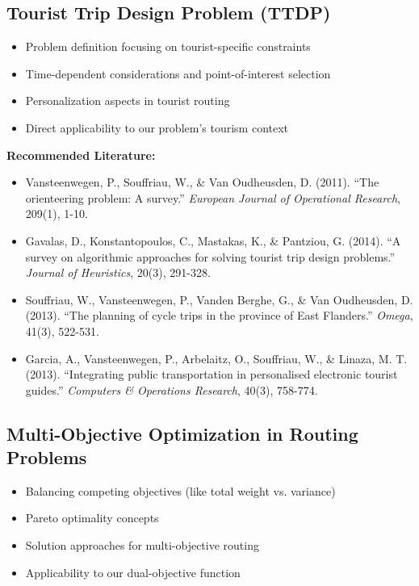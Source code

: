\subsection{Tourist Trip Design Problem (TTDP)}
\begin{itemize}
    \item Problem definition focusing on tourist-specific constraints
    \item Time-dependent considerations and point-of-interest selection
    \item Personalization aspects in tourist routing
    \item Direct applicability to our problem's tourism context
\end{itemize}

\noindent\textbf{Recommended Literature:}
\begin{itemize}
    \item Vansteenwegen, P., Souffriau, W., \& Van Oudheusden, D. (2011). ``The orienteering problem: A survey.'' \textit{European Journal of Operational Research}, 209(1), 1-10.
    \item Gavalas, D., Konstantopoulos, C., Mastakas, K., \& Pantziou, G. (2014). ``A survey on algorithmic approaches for solving tourist trip design problems.'' \textit{Journal of Heuristics}, 20(3), 291-328.
    \item Souffriau, W., Vansteenwegen, P., Vanden Berghe, G., \& Van Oudheusden, D. (2013). ``The planning of cycle trips in the province of East Flanders.'' \textit{Omega}, 41(3), 522-531.
    \item Garcia, A., Vansteenwegen, P., Arbelaitz, O., Souffriau, W., \& Linaza, M. T. (2013). ``Integrating public transportation in personalised electronic tourist guides.'' \textit{Computers \& Operations Research}, 40(3), 758-774.
\end{itemize}

\subsection{Multi-Objective Optimization in Routing Problems}
\begin{itemize}
    \item Balancing competing objectives (like total weight vs. variance)
    \item Pareto optimality concepts
    \item Solution approaches for multi-objective routing
    \item Applicability to our dual-objective function
\end{itemize}

